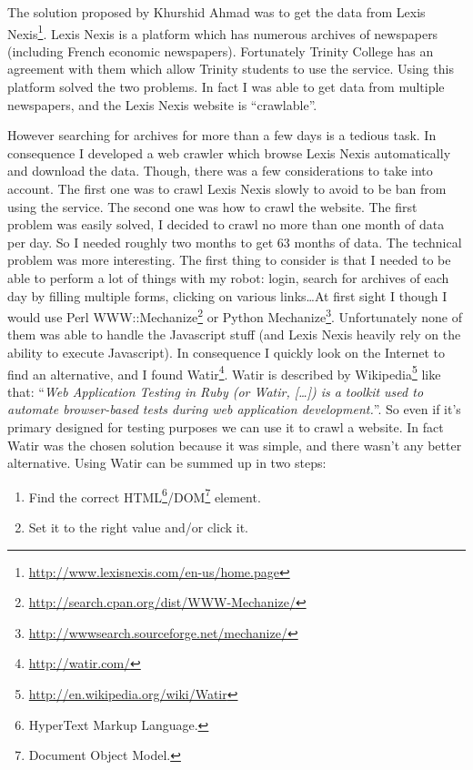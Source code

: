 \documentclass[12pt]{report}
\begin{document}
			The solution proposed by Khurshid Ahmad was to get the data from Lexis Nexis\footnote{\url{http://www.lexisnexis.com/en-us/home.page}}. Lexis Nexis is a platform which has numerous archives of newspapers (including French economic newspapers). Fortunately Trinity College has an agreement with them which allow Trinity students to use the service. Using this platform solved the two problems. In fact I was able to get data from multiple newspapers, and the Lexis Nexis website is ``crawlable''.
			
			However searching for archives for more than a few days is a tedious task. In consequence I developed a web crawler which browse Lexis Nexis automatically and download the data. Though, there was a few considerations to take into account. The first one was to crawl Lexis Nexis slowly to avoid to be ban from using the service. The second one was how to crawl the website. The first problem was easily solved, I decided to crawl no more than one month of data per day. So I needed roughly two months to get 63 months of data. The technical problem was more interesting. The first thing to consider is that I needed to be able to perform a lot of things with my robot: login, search for archives of each day by filling multiple forms, clicking on various links\ldots At first sight I though I would use Perl WWW::Mechanize\footnote{\url{http://search.cpan.org/dist/WWW-Mechanize/}} or Python Mechanize\footnote{\url{http://wwwsearch.sourceforge.net/mechanize/}}. Unfortunately none of them was able to handle the Javascript stuff (and Lexis Nexis heavily rely on the ability to execute Javascript). In consequence I quickly look on the Internet to find an alternative, and I found Watir\footnote{\url{http://watir.com/}}. Watir is described by Wikipedia\footnote{\url{http://en.wikipedia.org/wiki/Watir}} like that: ``\emph{Web Application Testing in Ruby (or Watir, [\ldots]) is a toolkit used to automate browser-based tests during web application development.}''. So even if it's primary designed for testing purposes we can use it to crawl a website. In fact Watir was the chosen solution because it was simple, and there wasn't any better alternative. Using Watir can be summed up in two steps:
			\begin{enumerate}
				\item Find the correct HTML\footnote{HyperText Markup Language.}/DOM\footnote{Document Object Model.} element.
				\item Set it to the right value and/or click it.
			\end{enumerate}
			
\end{document}
